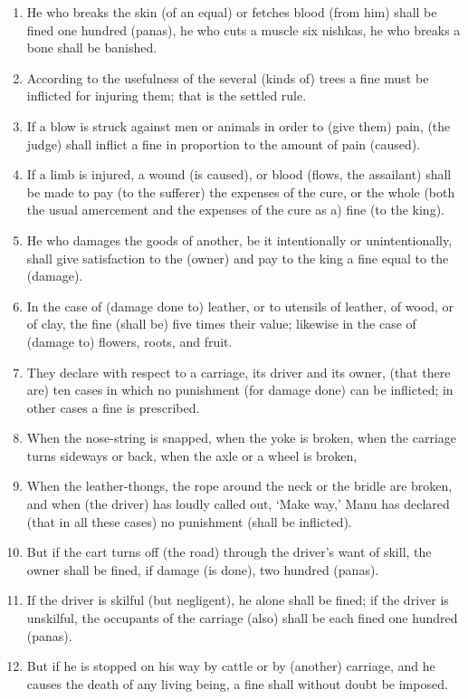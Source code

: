 \begin{enumerate}
\item He who breaks the skin (of an equal) or fetches blood (from him) shall be fined one hundred (panas), he who cuts a muscle six nishkas, he who breaks a bone shall be banished.
\item According to the usefulness of the several (kinds of) trees a fine must be inflicted for injuring them; that is the settled rule.
\item If a blow is struck against men or animals in order to (give them) pain, (the judge) shall inflict a fine in proportion to the amount of pain (caused).
\item If a limb is injured, a wound (is caused), or blood (flows, the assailant) shall be made to pay (to the sufferer) the expenses of the cure, or the whole (both the usual amercement and the expenses of the cure as a) fine (to the king).
\item He who damages the goods of another, be it intentionally or unintentionally, shall give satisfaction to the (owner) and pay to the king a fine equal to the (damage).
\item In the case of (damage done to) leather, or to utensils of leather, of wood, or of clay, the fine (shall be) five times their value; likewise in the case of (damage to) flowers, roots, and fruit.
\item They declare with respect to a carriage, its driver and its owner, (that there are) ten cases in which no punishment (for damage done) can be inflicted; in other cases a fine is prescribed.
\item When the nose-string is snapped, when the yoke is broken, when the carriage turns sideways or back, when the axle or a wheel is broken,
\item When the leather-thongs, the rope around the neck or the bridle are broken, and when (the driver) has loudly called out, `Make way,' Manu has declared (that in all these cases) no punishment (shall be inflicted).
\item But if the cart turns off (the road) through the driver's want of skill, the owner shall be fined, if damage (is done), two hundred (panas).
\item If the driver is skilful (but negligent), he alone shall be fined; if the driver is unskilful, the occupants of the carriage (also) shall be each fined one hundred (panas).
\item But if he is stopped on his way by cattle or by (another) carriage, and he causes the death of any living being, a fine shall without doubt be imposed.

\end{enumerate}
